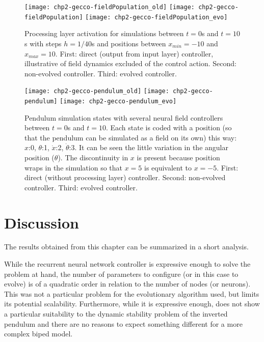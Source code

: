 \begin{figure}[p]
  \centering
  \texttt{[image: chp2-gecco-fieldPopulation\_old]}
  \texttt{[image: chp2-gecco-fieldPopulation]}
  \texttt{[image: chp2-gecco-fieldPopulation\_evo]}
  \caption{Processing layer activation for simulations between $t=0$s
    and $t=10$s with steps $h=1/40$s and positions between
    $x_{min}=-10$ and $x_{max}=10$. First: direct (output from input
    layer) controller, illustrative of field dynamics excluded of the
    control action. Second: non-evolved controller. Third: evolved
    controller.}
  \label{fig:processings}
\end{figure}


\begin{figure}
  \centering
  \texttt{[image: chp2-gecco-pendulum\_old]}
  \texttt{[image: chp2-gecco-pendulum]}
  \texttt{[image: chp2-gecco-pendulum\_evo]}
  \caption{Pendulum simulation states with several neural field
    controllers between $t=0$s and $t=10$. Each state is coded with a
    position (so that the pendulum can be simulated as a field on its
    own) this way: $x$:0, $\theta$:1, $\dot{x}$:2,
    $\dot{\theta}$:3. It can be seen the little variation in the
    angular position ($\theta$). The discontinuity in $x$ is present
    because position wraps in the simulation so that $x=5$ is
    equivalent to $x=-5$. First: direct (without processing layer)
    controller. Second: non-evolved controller. Third: evolved
    controller.}
  \label{fig:pendulum-states}
\end{figure}


\section{Discussion}
The results obtained from this chapter can be summarized in a short
analysis.

While the recurrent neural network controller is expressive enough to
solve the problem at hand, the number of parameters to configure (or
in this case to evolve) is of a quadratic order in relation to the
number of nodes (or neurons). This was not a particular problem for
the evolutionary algorithm used, but limits its potential
scalability. Furthermore, while it is expressive enough, does not show
a particular suitability to the dynamic stability problem of the
inverted pendulum and there are no reasons to expect something
different for a more complex biped model.

